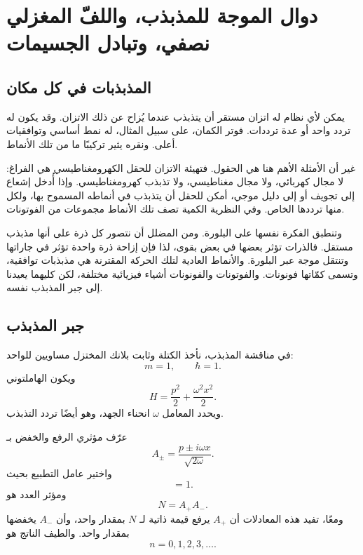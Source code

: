 \chapter{دوال الموجة للمذبذب، واللفّ المغزلي نصفي، وتبادل الجسيمات}

\section{المذبذبات في كل مكان}

يمكن لأي نظام له اتزان مستقر أن يتذبذب عندما يُزاح عن ذلك الاتزان. وقد يكون له تردد واحد أو عدة ترددات. فوتر الكمان، على سبيل المثال، له نمط أساسي وتوافقيات أعلى. ونقره يثير تركيبًا ما من تلك الأنماط.

غير أن الأمثلة الأهم هنا هي الحقول. فتهيئة الاتزان للحقل الكهرومغناطيسي هي الفراغ: لا مجال كهربائي، ولا مجال مغناطيسي، ولا تذبذب كهرومغناطيسي. وإذا أُدخل إشعاع إلى تجويف أو إلى دليل موجي، أمكن للحقل أن يتذبذب في أنماطه المسموح بها، ولكل منها ترددها الخاص. وفي النظرية الكمية تصف تلك الأنماط مجموعات من الفوتونات.

وتنطبق الفكرة نفسها على البلورة. ومن المضلل أن نتصور كل ذرة على أنها مذبذب مستقل. فالذرات تؤثر بعضها في بعض بقوى، لذا فإن إزاحة ذرة واحدة تؤثر في جاراتها وتنتقل موجة عبر البلورة. والأنماط العادية لتلك الحركة المقترنة هي مذبذبات توافقية، وتسمى كمّاتها فونونات. والفوتونات والفونونات أشياء فيزيائية مختلفة، لكن كليهما يعيدنا إلى جبر المذبذب نفسه.

\section{جبر المذبذب}

في مناقشة المذبذب، نأخذ الكتلة وثابت بلانك المختزل مساويين للواحد:
\[
m=1,\qquad \hbar=1.
\]
ويكون الهاملتوني
\begin{equation}
H=\frac{p^{2}}{2}+\frac{\omega^{2}x^{2}}{2}.
\end{equation}
ويحدد المعامل \(\omega\) انحناء الجهد، وهو أيضًا تردد التذبذب.

عرّف مؤثري الرفع والخفض بـ
\begin{equation}
A_{\pm}=\frac{p\pm i\omega x}{\sqrt{2\omega}}.
\end{equation}
واختير عامل التطبيع بحيث
\begin{equation}
[A_{-},A_{+}]=1.
\end{equation}
ومؤثر العدد هو
\begin{equation}
N=A_{+}A_{-}.
\end{equation}
ومعًا، تفيد هذه المعادلات أن \(A_{+}\) يرفع قيمة ذاتية لـ \(N\) بمقدار واحد، وأن \(A_{-}\) يخفضها بمقدار واحد. والطيف الناتج هو
\begin{equation}
n=0,1,2,3,\ldots .
\end{equation}

